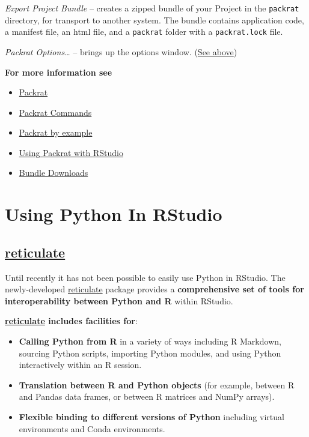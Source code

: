 \documentclass[]{book}
\providecommand{\tightlist}{%
  \setlength{\itemsep}{0pt}\setlength{\parskip}{0pt}}
\theoremstyle{definition}
\theoremstyle{definition}
\theoremstyle{definition}
\theoremstyle{remark}
\begin{document}
\emph{Export Project Bundle} -- creates a zipped bundle of your Project
in the \texttt{packrat} directory, for transport to another system. The
bundle contains application code, a manifest file, an html file, and a
\texttt{packrat} folder with a \texttt{packrat.lock} file.

\emph{Packrat Options\ldots{}} -- brings up the options window.
(\protect\hyperlink{packrat_options}{See above})

\textbf{For more information see}

\begin{itemize}
\tightlist
\item
  \href{https://rstudio.github.io/packrat/}{Packrat}
\item
  \href{https://rstudio.github.io/packrat/commands.html}{Packrat
  Commands}
\item
  \href{https://rstudio.github.io/packrat/walkthrough.html}{Packrat by
  example}
\item
  \href{https://rstudio.github.io/packrat/rstudio.html}{Using Packrat
  with RStudio}
\item
  \href{https://support.rstudio.com/hc/en-us/articles/115003639788-Bundle-Downloads}{Bundle
  Downloads}
\end{itemize}

\hypertarget{using-python-in-rstudio}{%
\section{Using Python In RStudio}\label{using-python-in-rstudio}}

\hypertarget{reticulate}{%
\subsection{\texorpdfstring{\href{https://rstudio.github.io/reticulate/index.html}{reticulate}}{reticulate}}\label{reticulate}}

Until recently it has not been possible to easily use Python in RStudio.
The newly-developed
\href{https://rstudio.github.io/reticulate/index.html}{reticulate}
package provides a \textbf{comprehensive set of tools for
interoperability between Python and R} within RStudio.

\textbf{\href{https://rstudio.github.io/reticulate/index.html}{reticulate}
includes facilities for}:

\begin{itemize}
\item
  \textbf{Calling Python from R} in a variety of ways including R
  Markdown, sourcing Python scripts, importing Python modules, and using
  Python interactively within an R session.
\item
  \textbf{Translation between R and Python objects} (for example,
  between R and Pandas data frames, or between R matrices and NumPy
  arrays).
\item
  \textbf{Flexible binding to different versions of Python} including
  virtual environments and Conda environments.
\end{itemize}
\end{document}
